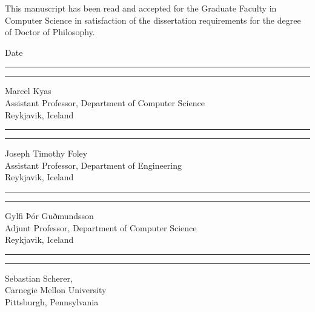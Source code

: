 \noindent This manuscript has been read and accepted for the Graduate Faculty in
Computer Science in satisfaction of the dissertation requirements for the
degree of Doctor of Philosophy.

\bigskip

 \hfill {Date}

\vspace{1.5\baselineskip}

\noindent\rule{3.5in}{0.7pt} \hfill \rule{1in}{0.7pt}

\noindent Marcel Kyas\\
Assistant Professor, Department of Computer Science\\ Reykjavik, Iceland
\vspace{1.5\baselineskip}

\noindent\rule{3.5in}{0.7pt} \hfill \rule{1in}{0.7pt}

\noindent Joseph Timothy Foley\\
Assistant Professor, Department of Engineering\\ Reykjavik, Iceland
\vspace{1.5\baselineskip}

\noindent\rule{3.5in}{0.7pt} \hfill \rule{1in}{0.7pt}

\noindent Gylfi Þór Guðmundsson\\
Adjunt Professor, Department of Computer Science\\Reykjavik, Iceland \par
\vspace{1.5\baselineskip}
\noindent\rule{3.5in}{0.7pt} \hfill \rule{1in}{0.7pt}

\noindent Sebastian Scherer,\\
Carnegie Mellon University\\Pittsburgh, Pennsylvania \\ 
\vspace{1\baselineskip}

\clearpage
